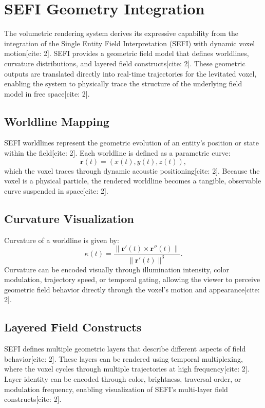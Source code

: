 \documentclass[10pt,twocolumn]{article}
\begin{document}
\section{SEFI Geometry Integration}
The volumetric rendering system derives its expressive capability from the integration of the Single Entity Field Interpretation (SEFI) with dynamic voxel motion[cite: 2]. SEFI provides a geometric field model that defines worldlines, curvature distributions, and layered field constructs[cite: 2]. These geometric outputs are translated directly into real-time trajectories for the levitated voxel, enabling the system to physically trace the structure of the underlying field model in free space[cite: 2].

\subsection{Worldline Mapping}
SEFI worldlines represent the geometric evolution of an entity's position or state within the field[cite: 2]. Each worldline is defined as a parametric curve:
\begin{equation}
\mathbf{r}(t) = (x(t), y(t), z(t)),
\end{equation}
which the voxel traces through dynamic acoustic positioning[cite: 2]. Because the voxel is a physical particle, the rendered worldline becomes a tangible, observable curve suspended in space[cite: 2].

\subsection{Curvature Visualization}
Curvature of a worldline is given by:
\begin{equation}
\kappa(t) = \frac{\|\mathbf{r}'(t) \times \mathbf{r}''(t)\|}{\|\mathbf{r}'(t)\|^3}.
\end{equation}
Curvature can be encoded visually through illumination intensity, color modulation, trajectory speed, or temporal gating, allowing the viewer to perceive geometric field behavior directly through the voxel's motion and appearance[cite: 2].

\subsection{Layered Field Constructs}
SEFI defines multiple geometric layers that describe different aspects of field behavior[cite: 2]. These layers can be rendered using temporal multiplexing, where the voxel cycles through multiple trajectories at high frequency[cite: 2]. Layer identity can be encoded through color, brightness, traversal order, or modulation frequency, enabling visualization of SEFI's multi-layer field constructs[cite: 2].
\end{document}
